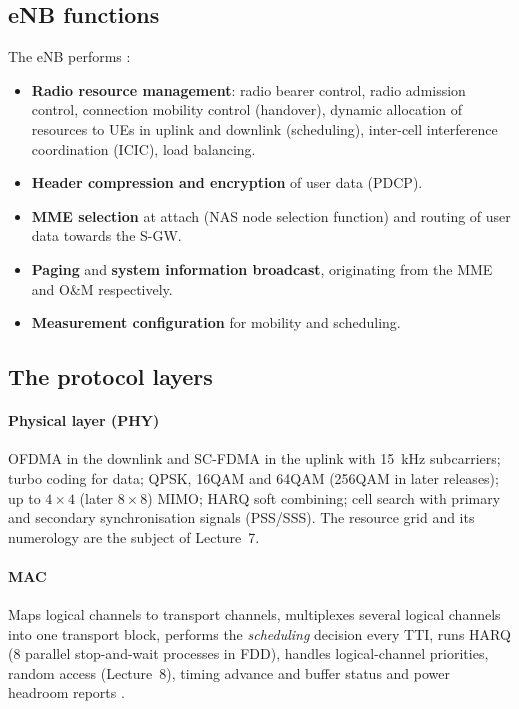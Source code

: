\documentclass[11pt,a4paper]{article}
\begin{document}
\subsection{eNB functions}
The eNB performs \cite{ts36300}:
\begin{itemize}
  \item \textbf{Radio resource management}: radio bearer control, radio admission control,
        connection mobility control (handover), dynamic allocation of resources to UEs in uplink
        and downlink (scheduling), inter-cell interference coordination (ICIC), load balancing.
  \item \textbf{Header compression and encryption} of user data (PDCP).
  \item \textbf{MME selection} at attach (NAS node selection function) and routing of user data
        towards the S-GW.
  \item \textbf{Paging} and \textbf{system information broadcast}, originating from the MME and
        O\&M respectively.
  \item \textbf{Measurement configuration} for mobility and scheduling.
\end{itemize}

\subsection{The protocol layers}
\paragraph{Physical layer (PHY)} OFDMA in the downlink and SC-FDMA in the uplink with
\qty{15}{\kilo\hertz} subcarriers; turbo coding for data; QPSK, 16QAM and 64QAM (256QAM in later
releases); up to $4\times4$ (later $8\times8$) MIMO; HARQ soft combining; cell search with
primary and secondary synchronisation signals (PSS/SSS). The resource grid and its numerology are
the subject of Lecture~7.

\paragraph{MAC} Maps logical channels to transport channels, multiplexes several logical channels
into one transport block, performs the \emph{scheduling} decision every TTI, runs HARQ (8 parallel
stop-and-wait processes in FDD), handles logical-channel priorities, random access (Lecture~8),
timing advance and buffer status and power headroom reports \cite{ts36321}.
\end{document}
